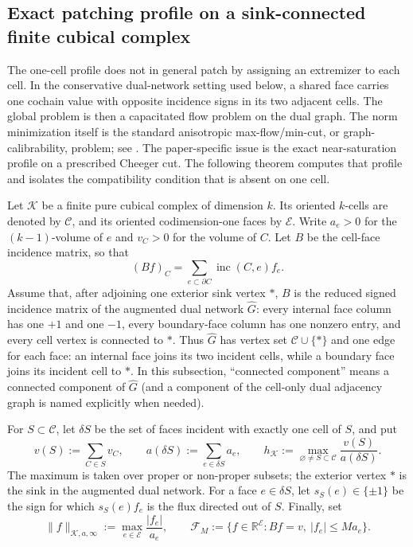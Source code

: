 \subsection{Exact patching profile on a sink-connected finite cubical complex}

The one-cell profile does not in general patch by assigning an extremizer to
each cell. In the conservative dual-network setting used below, a shared face
carries one cochain value with opposite incidence signs in its two adjacent
cells. The global problem is then a capacitated flow problem on the dual
graph. The norm minimization itself is the standard anisotropic
max-flow/min-cut, or graph-calibrability, problem; see
\cite{Nozawa1990,MazonSoleraToledo2020}. The paper-specific issue is the exact
near-saturation profile on a prescribed Cheeger cut. The following theorem
computes that profile and isolates the compatibility condition that is absent
on one cell.

Let $\mathcal K$ be a finite pure cubical complex of dimension $k$.  Its
oriented $k$-cells are denoted by $\mathcal C$, and its oriented
codimension-one faces by $\mathcal E$. Write $a_e>0$ for the $(k-1)$-volume
of $e$ and $v_C>0$ for the volume of $C$. Let $B$ be the cell-face incidence
matrix, so that
\[
(Bf)_C=\sum_{e\subset\partial C}\operatorname{inc}(C,e)f_e.
\]
Assume that, after adjoining one exterior sink vertex $\ast$, $B$ is the
reduced signed incidence matrix of the augmented dual network $\widehat G$:
every internal face column has one $+1$ and one $-1$, every boundary-face
column has one nonzero entry, and every cell vertex is connected to $\ast$.
Thus $\widehat G$ has vertex set $\mathcal C\cup\{\ast\}$ and one edge for
each face: an internal face joins its two incident cells, while a boundary
face joins its incident cell to $\ast$. In this subsection, ``connected
component'' means a connected component of $\widehat G$ (and a component of
the cell-only dual adjacency graph is named explicitly when needed).

For $S\subset\mathcal C$, let $\delta S$ be the set of faces incident with
exactly one cell of $S$, and put
\[
 v(S):=\sum_{C\in S}v_C,
 \qquad
 a(\delta S):=\sum_{e\in\delta S}a_e,
 \qquad
 h_{\mathcal K}:=
 \max_{\varnothing\ne S\subset\mathcal C}
 \frac{v(S)}{a(\delta S)}.
\]
The maximum is taken over proper or non-proper subsets; the exterior vertex
$\ast$ is the sink in the augmented dual network. For a face $e\in\delta S$, let
 $s_S(e)\in\{\pm1\}$ be the sign for which $s_S(e)f_e$ is the flux directed
 out of $S$.  Finally, set
\[
 \|f\|_{\mathcal K,a,\infty}:=
 \max_{e\in\mathcal E}\frac{|f_e|}{a_e},
 \qquad
 \mathcal F_M:=\{f\in\mathbb R^{\mathcal E}:Bf=v,\ |f_e|\le Ma_e\}.
\]

